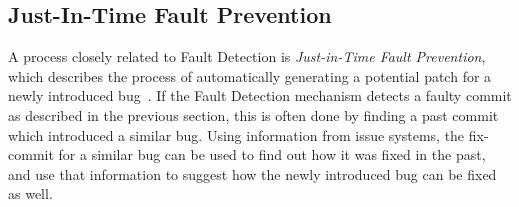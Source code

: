 
\subsection{Just-In-Time Fault Prevention}
\label{sec:faultprevention}

A process closely related to Fault Detection is \textit{Just-in-Time Fault Prevention}, which describes the process of automatically generating a potential patch for a newly introduced bug~\cite{Nayrolles2018}. If the Fault Detection mechanism detects a faulty commit as described in the previous section, this is often done by finding a past commit which introduced a similar bug. Using information from issue systems, the fix-commit for a similar bug can be used to find out how it was fixed in the past, and use that information to suggest how the newly introduced bug can be fixed as well.

